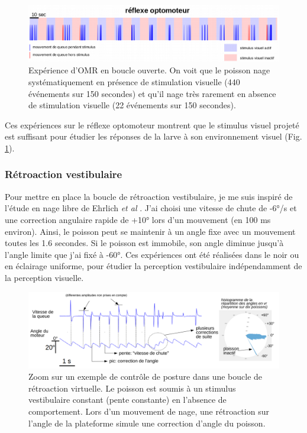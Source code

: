 
\begin{figure}
\centering
\includegraphics[width=\textwidth]{./files/omr.png}
\caption{Expérience d'OMR en boucle ouverte. On voit que le poisson nage systématiquement en présence de stimulation visuelle (440 événements sur 150 secondes) et qu'il nage très rarement en absence de stimulation visuelle (22 événements sur 150 secondes).}
\label{FigOMRopenloop}
\end{figure}

Ces expériences sur le réflexe optomoteur montrent que le stimulus visuel projeté est suffisant pour étudier les réponses de la larve à son environnement visuel (Fig. \ref{FigOMRopenloop}).

\subsubsection{Rétroaction vestibulaire}
Pour mettre en place la boucle de rétroaction vestibulaire, je me suis inspiré de l'étude en nage libre de Ehrlich \emph{et al} \cite{ehrlich_control_2017}. J'ai choisi une vitesse de chute de -6°/s et une correction angulaire rapide de +10° lors d'un mouvement (en 100 ms environ). Ainsi, le poisson peut se maintenir à un angle fixe avec un mouvement toutes les 1.6 secondes. Si le poisson est immobile, son angle diminue jusqu'à l'angle limite que j'ai fixé à -60°. Ces expériences ont été réalisées dans le noir ou en éclairage uniforme, pour étudier la perception vestibulaire indépendamment de la perception visuelle.

\begin{figure}
\centering
\includegraphics[width=\textwidth]{./files/vestibular_feedback.svg.png}
\caption{Zoom sur un exemple de contrôle de posture dans une boucle de rétroaction virtuelle. Le poisson est soumis à un stimulus vestibulaire constant (pente constante) en l'absence de comportement. Lors d'un mouvement de nage, une rétroaction sur l'angle de la plateforme simule une correction d'angle du poisson.}
\end{figure}

